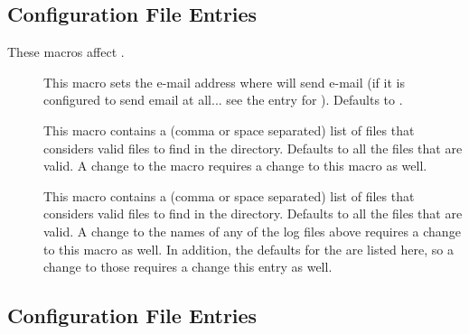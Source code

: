 \subsection{\label{sec:Preen-Config-File-Entries}
Configuration File Entries}

These macros affect .

\begin{description}

\item[] \label{param:PreenAdmin}  This macro
  sets the e-mail address where  will send e-mail (if
  it is configured to send email at all... see the entry for
  ).  Defaults to .

\item[] \label{param:ValidSpoolFiles}  This
  macro contains a (comma or space separated) list of files that
   considers valid files to find in the 
  directory.  Defaults to all the files that are valid.  A change
  to the  macro requires a change to this
  macro as well.
  
\item[] \label{param:ValidLogFiles} This
  macro contains a (comma or space separated) list of files that
   considers valid files to find in the 
  directory.  Defaults to all the files that are valid.  A change
  to the names of any of the log files above requires a change to this
  macro as well.  In addition, the defaults for the
   are listed here, so a change to
  those requires a change this entry as well.

\end{description}


\subsection{\label{sec:Collector-Config-File-Entries}
Configuration File Entries}

